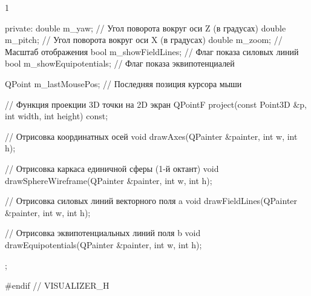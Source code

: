 \begin{listing}{1}
{private:
  double m_yaw;   // Угол поворота вокруг оси Z (в градусах)
  double m_pitch; // Угол поворота вокруг оси X (в градусах)
  double m_zoom;  // Масштаб отображения
  bool m_showFieldLines; // Флаг показа силовых линий
  bool m_showEquipotentials; // Флаг показа эквипотенциалей

  QPoint m_lastMousePos; // Последняя позиция курсора мыши

  // Функция проекции 3D точки на 2D экран
  QPointF project(const Point3D &p, int width, int height) const;

  // Отрисовка координатных осей
  void drawAxes(QPainter &painter, int w, int h);

  // Отрисовка каркаса единичной сферы (1-й октант)
  void drawSphereWireframe(QPainter &painter, int w, int h);

  // Отрисовка силовых линий векторного поля a
  void drawFieldLines(QPainter &painter, int w, int h);

  // Отрисовка эквипотенциальных линий поля b
  void drawEquipotentials(QPainter &painter, int w, int h);
};

#endif // VISUALIZER_H

\end{listing}
\normalsize
\pagebreak
